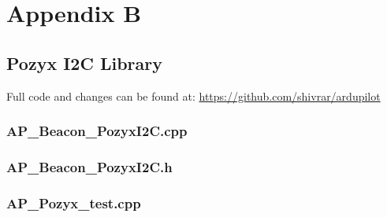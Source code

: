 %
%

\chapter{Appendix B}\label{app:app02}
\section{Pozyx I2C Library}\label{sec:pozyx-i2c-library} %
Full code and changes can be found at: \url{https://github.com/shivrar/ardupilot}
\subsection{AP\_Beacon\_PozyxI2C.cpp}\label{subsec:ap_beacon_pozyxi2c.cpp}

\newpage
\subsection{AP\_Beacon\_PozyxI2C.h}\label{subsec:ap_beacon_pozyxi2c.h}

\newpage
\subsection{AP\_Pozyx\_test.cpp}\label{subsec:ap_pozyx_test.cpp}

